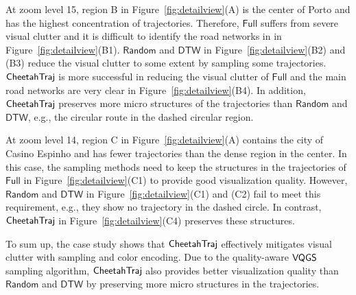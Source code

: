 At zoom level 15, region B in Figure~\ref{fig:detailview}(A) is the center of Porto and has the highest concentration of trajectories. Therefore, $\mathsf{Full}$ suffers from severe visual clutter and it is difficult to identify the road networks in in Figure~\ref{fig:detailview}(B1).  $\mathsf{Random}$ and $\mathsf{DTW}$ in Figure~\ref{fig:detailview}(B2) and (B3) reduce the visual clutter to some extent by sampling some trajectories. $\mathsf{CheetahTraj}$ is more successful in reducing the visual clutter of $\mathsf{Full}$ and the main road networks are very clear in Figure~\ref{fig:detailview}(B4). In addition, $\mathsf{CheetahTraj}$ preserves more micro structures of the trajectories than $\mathsf{Random}$ and $\mathsf{DTW}$, e.g., the circular route in the dashed circular region.                



At zoom level 14, region C in Figure~\ref{fig:detailview}(A) contains the city of Casino Espinho and has fewer trajectories than the dense region in the center. In this case, the sampling methods need to keep the structures in the trajectories of $\mathsf{Full}$ in Figure~\ref{fig:detailview}(C1) to provide good visualization quality. However, $\mathsf{Random}$ and $\mathsf{DTW}$ in Figure~\ref{fig:detailview}(C1) and (C2) fail to meet this requirement, e.g., they show no trajectory in the dashed circle. In contrast, $\mathsf{CheetahTraj}$ in Figure~\ref{fig:detailview}(C4) preserves these structures.          


To sum up, the case study shows that $\mathsf{CheetahTraj}$ effectively mitigates visual clutter with sampling and color encoding. Due to the quality-aware $\mathsf{VQGS}$ sampling algorithm, $\mathsf{CheetahTraj}$ also provides better visualization quality than $\mathsf{Random}$ and $\mathsf{DTW}$ by preserving more micro structures in the trajectories.     
